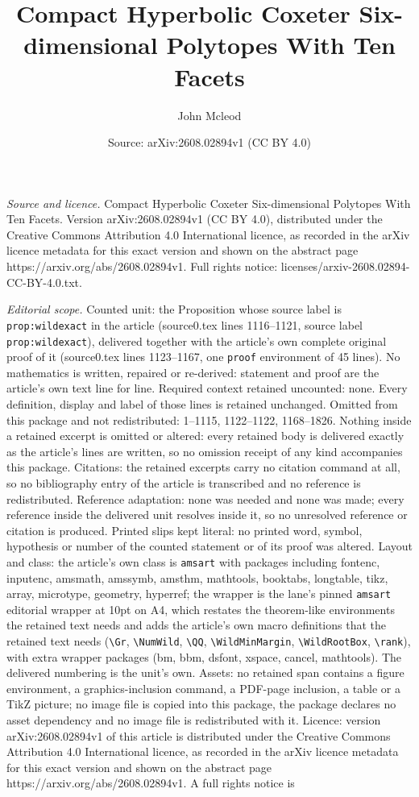 \documentclass[10pt,a4paper]{amsart}
\title[Compact Hyperbolic Coxeter Six-dimensional Polytopes With Te]{Compact Hyperbolic Coxeter Six-dimensional Polytopes With Ten Facets}
\author{John Mcleod}
\date{Source: arXiv:2608.02894v1 (CC BY 4.0)}
\begin{document}
\maketitle

\noindent\emph{Source and licence.} Compact Hyperbolic Coxeter Six-dimensional Polytopes With Ten Facets. Version arXiv:2608.02894v1 (CC BY 4.0), distributed under the Creative Commons Attribution 4.0 International licence, as recorded in the arXiv licence metadata for this exact version and shown on the abstract page https://arxiv.org/abs/2608.02894v1. Full rights notice: licenses/arxiv-2608.02894-CC-BY-4.0.txt.\par\smallskip

\noindent\textit{Editorial scope.} Counted unit: the Proposition whose source label is \texttt{prop:wildexact} in the article (source0.tex lines 1116--1121, source label \texttt{prop:wildexact}), delivered together with the article's own complete original proof of it (source0.tex lines 1123--1167, one \texttt{proof} environment of 45 lines). No mathematics is written, repaired or re-derived: statement and proof are the article's own text line for line. Required context retained uncounted: none. Every definition, display and label of those lines is retained unchanged. Omitted from this package and not redistributed: 1--1115, 1122--1122, 1168--1826. Nothing inside a retained excerpt is omitted or altered: every retained body is delivered exactly as the article's lines are written, so no omission receipt of any kind accompanies this package. Citations: the retained excerpts carry no citation command at all, so no bibliography entry of the article is transcribed and no reference is redistributed. Reference adaptation: none was needed and none was made; every reference inside the delivered unit resolves inside it, so no unresolved reference or citation is produced. Printed slips kept literal: no printed word, symbol, hypothesis or number of the counted statement or of its proof was altered. Layout and class: the article's own class is \texttt{amsart} with packages including fontenc, inputenc, amsmath, amssymb, amsthm, mathtools, booktabs, longtable, tikz, array, microtype, geometry, hyperref; the wrapper is the lane's pinned \texttt{amsart} editorial wrapper at 10pt on A4, which restates the theorem-like environments the retained text needs and adds the article's own macro definitions that the retained text needs (\texttt{\textbackslash Gr}, \texttt{\textbackslash NumWild}, \texttt{\textbackslash QQ}, \texttt{\textbackslash WildMinMargin}, \texttt{\textbackslash WildRootBox}, \texttt{\textbackslash rank}), with extra wrapper packages (bm, bbm, dsfont, xspace, cancel, mathtools). The delivered numbering is the unit's own. Assets: no retained span contains a figure environment, a graphics-inclusion command, a PDF-page inclusion, a table or a TikZ picture; no image file is copied into this package, the package declares no asset dependency and no image file is redistributed with it. Licence: version arXiv:2608.02894v1 of this article is distributed under the Creative Commons Attribution 4.0 International licence, as recorded in the arXiv licence metadata for this exact version and shown on the abstract page https://arxiv.org/abs/2608.02894v1. A full rights notice is 
\end{document}
